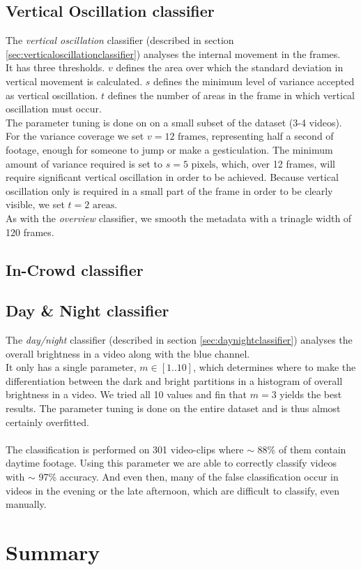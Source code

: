 \subsection{Vertical Oscillation classifier}
%
The \textit{vertical oscillation} classifier (described in section \ref{sec:verticaloscillationclassifier}) analyses the internal movement in the frames.\\
It has three thresholds. $v$ defines the area over which the standard deviation in vertical movement is calculated. $s$ defines the minimum level of variance accepted as vertical oscillation. $t$ defines the number of areas in the frame in which vertical oscillation must occur.\\
The parameter tuning is done on on a small subset of the dataset (3-4 videos). For the variance coverage we set $v = 12 \text{ frames}$, representing half a second of footage, enough for someone to jump or make a gesticulation. The minimum amount of variance required is set to $s = 5 \text{ pixels}$, which, over 12 frames, will require significant vertical oscillation in order to be achieved. Because vertical oscillation only is required in a small part of the frame in order to be clearly visible, we set $t = 2 \text{ areas}$.\\
As with the \textit{overview} classifier, we smooth the metadata with a trinagle width of 120 frames.
%
\subsection{In-Crowd classifier}
%
\subsection{Day \& Night classifier}
%
The \textit{day/night} classifier (described in section \ref{sec:daynightclassifier}) analyses the overall brightness in a video along with the blue channel.\\
It only has a single parameter, $m\in [1..10]$, which determines where to make the differentiation between the dark and bright partitions in a histogram of overall brightness in a video. We tried all 10 values and fin that $m = 3$ yields the best results. The parameter tuning is done on the entire dataset and is thus almost certainly overfitted.\\\\
%
The classification is performed on 301 video-clips where $\sim$ 88\% of them contain daytime footage. Using this parameter we are able to correctly classify videos with $\sim$ 97\% accuracy. And even then, many of the false classification occur in videos in the evening or the late afternoon, which are difficult to classify, even manually.
%
\section{Summary}
%
%